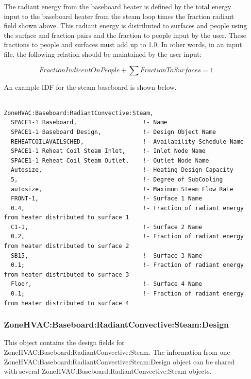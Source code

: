The radiant energy from the baseboard heater is defined by the total energy input to the baseboard heater from the steam loop times the fraction radiant field shown above. This radiant energy is distributed to surfaces and people using the surface and fraction pairs and the fraction to people input by the user. These fractions to people and surfaces must add up to 1.0. In other words, in an input file, the following relation should be maintained by the user input:

\begin{equation}
FractionIndicentOnPeople + \sum {FractionToSurfaces = 1}
\end{equation}

An example IDF for the steam baseboard is shown below.

\begin{lstlisting}

ZoneHVAC:Baseboard:RadiantConvective:Steam,
  SPACE1-1 Baseboard,                   !- Name
  SPACE1-1 Baseboard Design,            !- Design Object Name
  REHEATCOILAVAILSCHED,                 !- Availability Schedule Name
  SPACE1-1 Reheat Coil Steam Inlet,     !- Inlet Node Name
  SPACE1-1 Reheat Coil Steam Outlet,    !- Outlet Node Name
  Autosize,                             !- Heating Design Capacity
  5,                                    !- Degree of SubCooling
  autosize,                             !- Maximum Steam Flow Rate
  FRONT-1,                              !- Surface 1 Name
  0.4,                                  !- Fraction of radiant energy from heater distributed to surface 1
  C1-1,                                 !- Surface 2 Name
  0.2,                                  !- Fraction of radiant energy from heater distributed to surface 2
  SB15,                                 !- Surface 3 Name
  0.1;                                  !- Fraction of radiant energy from heater distributed to surface 3
  Floor,                                !- Surface 4 Name
  0.1;                                  !- Fraction of radiant energy from heater distributed to surface 4
\end{lstlisting}

\subsubsection{ZoneHVAC:Baseboard:RadiantConvective:Steam:Design}\label{ZoneHVAC:Baseboard:RadiantConvective:Steam:Design}


This object contains the design fields for ZoneHVAC:Baseboard:RadiantConvective:Steam. The information from one ZoneHVAC:Baseboard:RadiantConvective:Steam:Design object can be shared with several ZoneHVAC:Baseboard:RadiantConvective:Steam objects.

